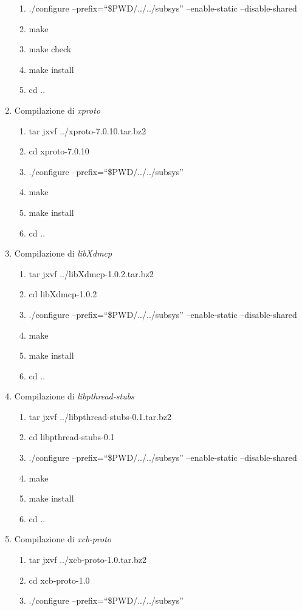 \begin{enumerate}
\begin{enumerate}
\item ./configure --prefix=``\$PWD/../../subsys'' --enable-static --disable-shared
\item make
\item make check
\item make install
\item cd ..
\end{enumerate}
\item Compilazione di \emph{xproto}
\begin{enumerate}
\item tar jxvf ../xproto-7.0.10.tar.bz2
\item cd xproto-7.0.10
\item ./configure --prefix=``\$PWD/../../subsys''
\item make
\item make install
\item cd ..
\end{enumerate}
\item Compilazione di \emph{libXdmcp}
\begin{enumerate}
\item tar jxvf ../libXdmcp-1.0.2.tar.bz2
\item cd libXdmcp-1.0.2
\item ./configure --prefix=``\$PWD/../../subsys'' --enable-static --disable-shared
\item make
\item make install
\item cd ..
\end{enumerate}
\item Compilazione di \emph{libpthread-stubs}
\begin{enumerate}
\item tar jxvf ../libpthread-stubs-0.1.tar.bz2
\item cd libpthread-stubs-0.1
\item ./configure --prefix=``\$PWD/../../subsys'' --enable-static --disable-shared
\item make
\item make install
\item cd ..
\end{enumerate}
\item Compilazione di \emph{xcb-proto}
\begin{enumerate}
\item tar jxvf ../xcb-proto-1.0.tar.bz2
\item cd xcb-proto-1.0
\item ./configure --prefix=``\$PWD/../../subsys''

\end{enumerate}
\end{enumerate}
